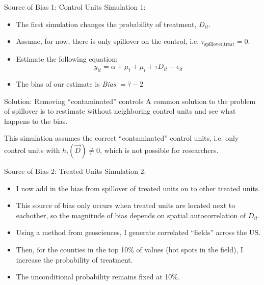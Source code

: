 \documentclass[aspectratio=43]{beamer}
\begin{document}
\begin{frame}{Source of Bias 1: Control Units}
    Simulation 1: 
    
    \begin{itemize}
        \item The first simulation changes the probability of treatment, $D_{it}$.
        
        \item Assume, for now, there is only spillover on the control, i.e. $\tau_{\text{spillover,treat}} = 0$.
        
        \item Estimate the following equation: \[ 
            y_{it} = \alpha + \mu_t + \mu_i + \tau D_{it} + \epsilon_{it}    
        \]
        
        \item The bias of our estimate is \textit{Bias} $= \hat{\tau} - 2$
    \end{itemize}


    
\end{frame}



\begin{frame}{Solution: Removing ``contaminated'' controls}
    A common solution to the problem of spillover is to restimate without neighboring control units and see what happens to the bias.

    This simulation assumes the correct ``contaminated'' control units, i.e. only control units with $h_i(\vec{D}) \neq 0$, which is not possible for researchers.
\end{frame}



\begin{frame}{Source of Bias 2: Treated Units}
    Simulation 2:

    \begin{itemize}
        \item I now add in the bias from spillover of treated units on to other treated units.
        
        \item This source of bias only occurs when treated units are located next to eachother, so the magnitude of bias depends on spatial autocorrelation of $D_{it}$. 
        
        \item Using a method from geosciences, I generate correlated ``fields'' across the US. 
        
        \item Then, for the counties in the top 10\% of values (hot spots in the field), I increase the probability of treatment. 
        
        \item The unconditional probability remains fixed at 10\%.
    \end{itemize}
\end{frame}
\end{document}
